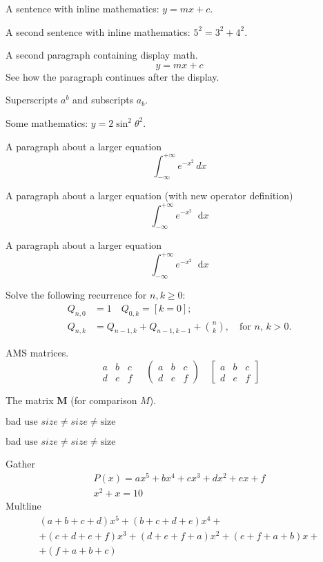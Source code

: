 \documentclass[fleqn,leqno]{article}
\newcommand{\diff}{\mathop{}\!\mathrm{d}} %
\begin{document}
A sentence with inline mathematics: \(y = mx + c\).

A second sentence with inline mathematics:
$5^{2}=3^{2}+4^{2}$.

A second paragraph containing display math.
\[
y = mx + c
\]
See how the paragraph continues after the display.

Superscripts $a^{b}$ and subscripts $a_{b}$.

Some mathematics: $y = 2 \sin^2 \theta^{2}$.

A paragraph about a larger equation
\[
\int_{-\infty}^{+\infty} e^{-x^2} \, dx
\]

A paragraph about a larger equation (with new operator definition)
\[
\int_{-\infty}^{+\infty} e^{-x^2} \diff x
\]

A paragraph about a larger equation
\begin{equation}
\int_{-\infty}^{+\infty} e^{-x^2} \diff x
\end{equation}


Solve the following recurrence for $ n,k\geq 0 $:
\begin{align*}
Q_{n,0} &= 1 \quad Q_{0,k} = [k=0]; \\
Q_{n,k} &= Q_{n-1,k}+Q_{n-1,k-1}+\binom{n}{k},
\quad\text{for $n$, $k>0$.}
\end{align*}

AMS matrices.
\[
\begin{matrix}
a & b & c \\
d & e & f
\end{matrix}
\quad
\begin{pmatrix}
a & b & c \\
d & e & f
\end{pmatrix}
\quad
\begin{bmatrix}
a & b & c \\
d & e & f
\end{bmatrix}
\]


The matrix $\mathbf{M}$ (for comparison $M$).

$\text{bad use } size \neq \mathit{size} \neq \mathrm{size} $

\textit{$\text{bad use } size \neq \mathit{size} \neq
\mathrm{size} $}


Gather
\begin{gather}
P(x)=ax^{5}+bx^{4}+cx^{3}+dx^{2}+ex +f\\
x^2+x=10
\end{gather}
Multline
\begin{multline*}
(a+b+c+d)x^{5}+(b+c+d+e)x^{4} + \\
+(c+d+e+f)x^{3}+(d+e+f+a)x^{2}+(e+f+a+b)x + \\
+ (f+a+b+c)
\end{multline*}
\end{document}
